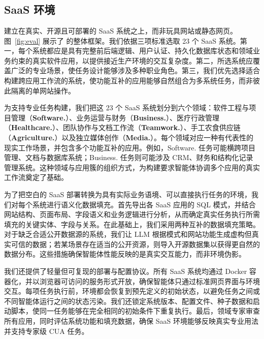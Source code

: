 \section{\datasetname}
\label{saas}

\subsection{SaaS 环境}
\label{saas-env}

\datasetname 建立在真实、开源且可部署的 SaaS 系统之上，而非玩具网站或静态网页。图~\ref{fig:eval} 展示了 \datasetname 的整体框架。我们依据三项标准选取 23 个 SaaS 系统。第一，每个系统都应是具有完整前后端逻辑、用户认证、持久化数据库状态和领域业务约束的真实软件应用，以提供接近生产环境的交互复杂度。第二，所选系统应覆盖广泛的专业场景，使任务设计能够涉及多种职业角色。第三，我们优先选择适合构建跨应用工作流的系统，使功能互补的应用能够自然组合为多系统任务，而非彼此隔离的单网站操作。

为支持专业任务构建，我们把这 23 个 SaaS 系统划分到六个领域：软件工程与项目管理（\textbf{Software.}）、业务运营与财务（\textbf{Business.}）、医疗行政管理（\textbf{Healthcare.}）、团队协作与文档工作流（\textbf{Teamwork.}）、手工农食供应链（\textbf{Agriculture.}）以及独立媒体创作（\textbf{Media.}）。每个领域对应一种有代表性的现实工作场景，并包含多个功能互补的应用。例如，Software. 任务可能横跨项目管理、文档与数据库系统；Business. 任务则可能涉及 CRM、财务和结构化记录管理系统。这种领域与应用簇的组织方式，为构建要求智能体协调多个应用的真实工作流奠定了基础。

为了把空白的 SaaS 部署转换为具有实际业务语境、可以直接执行任务的环境，我们对每个系统进行语义化数据填充。首先导出各 SaaS 应用的 SQL 模式，并结合网站结构、页面布局、字段语义和业务逻辑进行分析，从而确定真实任务执行所需填充的关键实体、字段与关系。在此基础上，我们采用两种互补的数据填充策略。对于缺乏合适公开数据源的系统，我们让 LLM 根据模式和网站功能生成虚构但真实可信的数据；若某场景存在适当的公开资源，则导入开源数据集以获得更自然的数据分布。这些措施确保智能体性能反映的是真实交互能力，而非环境伪影。

我们还提供了轻量但可复现的部署与配置协议。所有 SaaS 系统均通过 Docker 容器化，并以浏览器可访问的服务形式开放，确保智能体只通过标准网页界面与环境交互。每项任务执行前，环境都会恢复到预先定义的初始状态，以避免任务之间或不同智能体运行之间的状态污染。我们还锁定系统版本、配置文件、种子数据和启动脚本，使同一任务能够在完全相同的初始条件下重复执行。最后，领域专家审查所有应用，同时评估系统功能和填充数据，确保 SaaS 环境能够反映真实专业用法并支持专家级 CUA 任务。


